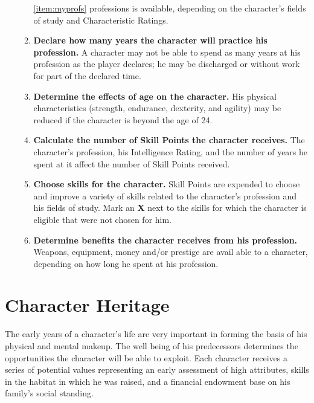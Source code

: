 \begin{enumerate}
\begin{enumerate}
    \ref{item:myprofs}
    professions is available, depending on the character's fields of
    study and Characteristic Ratings.
  \item \textbf{Declare how many years the character will practice his
      profession.} A character may not be able to spend as many years
    at his profession as the player declares; he may be discharged or
    without work for part of the declared time.
  \item \textbf{Determine the effects of age on the character.} His
    physical characteristics (strength, endurance, dexterity, and
    agility) may be reduced if the character is beyond the age of 24.
  \item \textbf{Calculate the number of Skill Points the character
      receives.}  The character's profession, his Intelligence Rating,
    and the number of years he spent at it affect the number of Skill
    Points received.
  \item \textbf{Choose skills for the character.} Skill Points are
    expended to choose and improve a variety of skills related to the
    character's profession and his fields of study. Mark an \textbf{\textsf{X}}
    next to the skills for which the character is eligible that were
    not chosen for him.
  \item \textbf{Determine benefits the character receives from his
      profession.}  Weapons, equipment, money and/or prestige are avail
    able to a character, depending on how long he spent at his
    profession.
  \end{enumerate}
\end{enumerate}
\renewcommand{\theenumi}{\arabic{enumi}}
\renewcommand{\theenumii}{(\alph{enumii})}


\section{Character Heritage}
\label{sec:character-heritage}

The early years of a character's life are very important in forming
the basis of his physical and mental makeup. The well being of his
predecessors determines the opportunities the character will be able
to exploit. Each character receives a series of potential values
representing an early assessment of high attributes, skills in the
habitat in which he was raised, and a financial endowment base on his
family's social standing.




